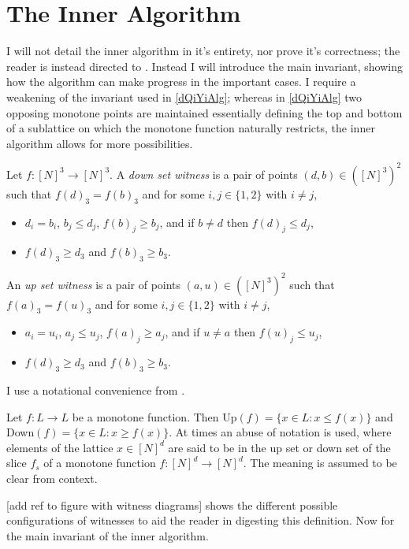 \section{The Inner Algorithm}
I will not detail the inner algorithm in it's entirety, nor prove it's correctness;
the reader is instead directed to \citep{fasterTarski}. Instead I will introduce
the main invariant, showing how the algorithm can make progress in the important 
cases. I require a weakening of the invariant used in \cref{dQiYiAlg}; whereas
in \cref{dQiYiAlg} two opposing monotone points are maintained essentially
defining the top and bottom of a sublattice on which the monotone function
naturally restricts, the inner algorithm allows for more possibilities.
\begin{definition}
  Let $f : [N]^3 \to [N]^3$. A \emph{down set witness} is a pair of points
  $(d, b) \in ([N]^3)^2$ such that $f(d)_3 = f(b)_3$ and for some $i, j \in \{1, 2\}$
  with $i \neq j$,
  \begin{itemize}
    \item $d_i = b_i$, $b_j \leq d_j$, $f(b)_j \geq b_j$, and if $b \neq d$ then $f(d)_j \leq d_j$,
    \item $f(d)_3 \geq d_3$ and $f(b)_3 \geq b_3$.
  \end{itemize}
  An \emph{up set witness} is a pair of points
  $(a, u) \in ([N]^3)^2$ such that $f(a)_3 = f(u)_3$ and for some $i, j \in \{1, 2\}$
  with $i \neq j$,
  \begin{itemize}
    \item $a_i = u_i$, $a_j \leq u_j$, $f(a)_j \geq a_j$, and if $u \neq a$ then $f(u)_j \leq u_j$,
    \item $f(d)_3 \geq d_3$ and $f(b)_3 \geq b_3$.
  \end{itemize}
\end{definition}
I use a notational convenience from \citep{fasterTarski}.
\begin{notation}
  Let $f : L \to L$ be a monotone function. Then Up$(f) = \{x \in L : x \leq f(x)\}$
  and Down$(f) = \{x \in L : x \geq f(x)\}$. At times an abuse of notation is used,
  where elements of the lattice $x \in [N]^d$ are said to be in the up set or down
  set of the slice $f_s$ of a monotone function $f : [N]^d \to [N]^d$. The meaning
  is assumed to be clear from context.
\end{notation}
[add ref to figure with witness diagrams] shows the different possible configurations
of witnesses to aid the reader in digesting this definition.
Now for the main invariant of the inner algorithm.
